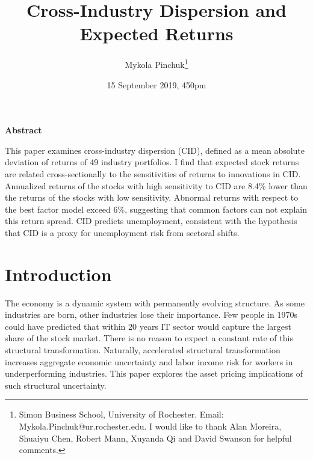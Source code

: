 \documentclass[12pt]{article}
\begin{document}
\onehalfspacing      %
\renewcommand{\footnote}{\endnote}  %

\author{\large{Mykola Pinchuk}\thanks{\rm Simon Business School, University of Rochester. Email: Mykola.Pinchuk@ur.rochester.edu. \newline I would like to thank Alan Moreira, Shuaiyu Chen, Robert Mann, Xuyanda Qi and David Swanson for helpful comments.}}

\title{\bf Cross-Industry Dispersion and Expected Returns}

\date{15 September 2019, 450pm}  

\maketitle
\thispagestyle{empty}

\bigskip

\normalsize
\vspace{1cm}

\centerline{\bf Abstract}

\vspace{0.5cm}

\begin{onehalfspace}  %
  \noindent This paper examines cross-industry dispersion (CID), defined as a mean absolute deviation of returns of 49 industry portfolios. I find that expected stock returns are related cross-sectionally to the sensitivities of returns to innovations in CID. Annualized returns of the stocks with high sensitivity to CID are 8.4\% lower than the returns of the stocks with low sensitivity. Abnormal returns with respect to the best factor model exceed 6\%, suggesting that common factors can not explain this return spread. CID predicts unemployment, consistent with the hypothesis that CID is a proxy for unemployment risk from sectoral shifts.
\end{onehalfspace}
\medskip


\clearpage
{}


\section{Introduction} \label{sec:Model}
The economy is a dynamic system with permanently evolving structure. As some industries are born, other industries lose their importance. Few people in 1970s could have predicted that within 20 years IT sector would capture the largest share of the stock market. There is no reason to expect a constant rate of this structural transformation. Naturally, accelerated structural transformation increases aggregate economic uncertainty and labor income risk for workers in underperforming industries. This paper explores the asset pricing implications of such structural uncertainty.
\end{document}
